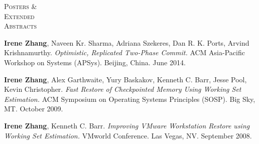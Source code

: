 \documentclass[10pt,times]{report}
\newlength{\sectiongap}
\newlength{\sectioncolwidth}
\newlength{\colgap}
\newlength{\stuffwidth}
\newenvironment{rtable}{
  \begin{minipage}{\textwidth}
  }{
  \end{minipage}
}
\newenvironment{rsection}[1]{
  \begin{minipage}[t]{\sectioncolwidth}
    \textsc{#1}
  \end{minipage}
  \hspace{\colgap}
  \begin{minipage}[t]{\stuffwidth}
  }{
    \removelastskip
  \end{minipage}
  \\[\sectiongap]
}
\begin{document}
\begin{rtable}
  \begin{rsection}{Posters \&\\Extended\\Abstracts}
    \textbf{Irene Zhang}, Naveen Kr. Sharma, Adriana Szekeres, Dan
    R. K. Ports, Arvind Krishnamurthy. \textit{Optimistic, Replicated
      Two-Phase Commit.}  ACM Asia-Pacific Workshop on Systems (APSys). Beijing, China. June 2014.\\\vspace{-.5em}

    \textbf{Irene Zhang}, Alex Garthwaite, Yury Baskakov, Kenneth
    C. Barr, Jesse Pool, Kevin Christopher. \textit{Fast Restore of
      Checkpointed Memory Using Working Set Estimation.} ACM Symposium
    on Operating Systems Principles (SOSP).  Big Sky, MT. October
    2009.\\\vspace{-0.5em}

    \textbf{Irene Zhang}, Kenneth C. Barr.  \textit{Improving VMware
      Workstation Restore using Working Set Estimation.}  VMworld
    Conference. Las Vegas, NV. September 2008.\\ \vspace{-0.5em}
  \end{rsection}


\end{rtable}
\end{document}
